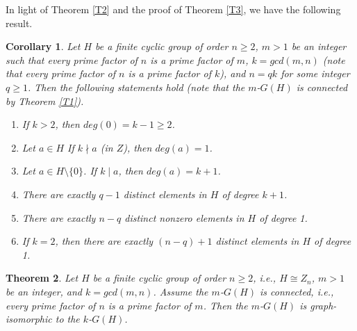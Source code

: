 \documentclass{amsart}
\newtheorem{thm}{Theorem}[section]
\theoremstyle{plain}
\newtheorem{cor}[thm]{Corollary}
\begin{document}
	In light of Theorem \ref{T2} and the proof of Theorem \ref{T3}, we have the following result.
\begin{cor}\label{C2}
	Let $H$ be a finite cyclic group of order $n \geq 2$, $m > 1$ be an integer such that every prime factor of $n$ is a prime factor of $m$, $k = gcd(m, n)$ (note that every prime factor of $n$ is a prime factor of $k$), and $n = qk$ for some integer $q \geq 1$. Then the following statements hold (note that the $m$-$G(H)$ is connected by Theorem \ref{T1}).
	\begin{enumerate}
		\item If $k > 2$, then $deg(0) = k  - 1 \geq 2$.
		\item Let $a\in H$ If $k \nmid a$ (in $Z$), then $deg(a) = 1$.
		\item Let $a \in H \setminus \{ 0\}$. If $k \mid a$, then $deg(a) = k + 1$.
		\item There are exactly $q - 1$ distinct elements in $H$ of degree $k + 1$.
		\item There are exactly $n - q$ distinct nonzero elements in $H$ of degree 1.
		\item If $k = 2$, then there are exactly $(n - q) + 1$ distinct elements in $H$ of degree 1.
	\end{enumerate}
\end{cor}
\begin{thm}\label{Tciso}
Let $H$ be a finite cyclic group of order $n \geq 2$, i.e., $H \cong Z_n$, $m > 1$ be an integer, and $k = gcd(m, n)$.  Assume the $m$-$G(H)$ is connected, i.e., every prime factor of $n$ is a prime factor of $m$. Then the $m$-$G(H)$ is graph-isomorphic to the $k$-$G(H)$.
\end{thm}
\end{document}
